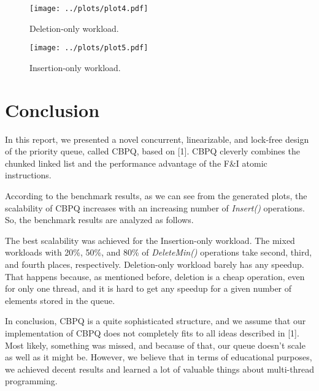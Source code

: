 \documentclass{article}
\begin{document}
  \begin{figure}[H]
    \centering
    \texttt{[image: ../plots/plot4.pdf]}
    \caption{Deletion-only workload.}
    \label{fig:plot4}
  \end{figure}

  \begin{figure}[H]
    \centering
    \texttt{[image: ../plots/plot5.pdf]}
    \caption{Insertion-only workload.}
    \label{fig:plot5}
  \end{figure}

  \section{Conclusion}
  In this report, we presented a novel concurrent, linearizable, and lock-free design of the priority queue, called CBPQ, based on [1]. CBPQ cleverly combines the chunked linked list and the performance advantage of the F\&I atomic instructions.\par
  According to the benchmark results, as we can see from the generated plots, the scalability of CBPQ increases with an increasing number of \textit{Insert()} operations. So, the benchmark results are analyzed as follows.\par

  The best scalability was achieved for the Insertion-only workload. The mixed workloads with 20\%, 50\%, and 80\% of \textit{DeleteMin()} operations take second, third, and fourth places, respectively. Deletion-only workload barely has any speedup. That happens because, as mentioned before, deletion is a cheap operation, even for only one thread, and it is hard to get any speedup for a given number of elements stored in the queue.\par

  In conclusion, CBPQ is a quite sophisticated structure, and we assume that our implementation of CBPQ does not completely fits to all ideas described in [1]. Most likely, something was missed, and because of that, our queue doesn't scale as well as it might be. However, we believe that in terms of educational purposes, we achieved decent results and learned a lot of valuable things about multi-thread programming.

  \pagebreak
\end{document}
